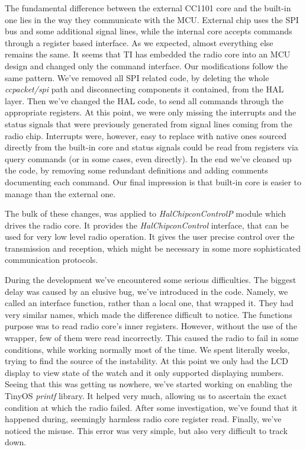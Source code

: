 The fundamental difference between the external CC1101 core and the built-in one lies in the way they communicate with the MCU. External chip uses the SPI bus and some additional signal lines, while the internal core accepts commands through a register based interface. As we expected, almost everything else remains the same. It seems that TI has embedded the radio core into an MCU design and changed only the command interface. Our modifications follow the same pattern. We've removed all SPI related code, by deleting the whole \emph{ccpacket/spi} path and disconnecting components it contained, from the HAL layer. Then we've changed the HAL code, to send all commands through the appropriate registers. At this point, we were only missing the interrupts and the status signals that were previously generated from signal lines coming from the radio chip. Interrupts were, however, easy to replace with native ones sourced directly from the built-in core and status signals could be read from registers via query commands (or in some cases, even directly). In the end we've cleaned up the code, by removing some redundant definitions and adding comments documenting each command. Our final impression is that built-in core is easier to manage than the external one.

The bulk of these changes, was applied to \emph{HalChipconControlP} module which drives the radio core. It provides the \emph{HalChipconControl} interface, that can be used for very low level radio operation. It gives the user precise control over the transmission and reception, which might be necessary in some more sophisticated communication protocols.

During the development we've encountered some serious difficulties. The biggest delay was caused by an elusive bug, we've introduced in the code. Namely, we called an interface function, rather than a local one, that wrapped it. They had very similar names, which made the difference difficult to notice. The functions purpose was to read radio core's inner registers. However, without the use of the wrapper, few of them were read incorrectly. This caused the radio to fail in some conditions, while working normally most of the time. We spent literally weeks, trying to find the source of the instability. At this point we only had the LCD display to view state of the watch and it only supported displaying numbers. Seeing that this was getting us nowhere, we've started working on enabling the TinyOS \emph{printf} library. It helped very much, allowing us to ascertain the exact condition at which the radio failed. After some investigation, we've found that it happened during, seemingly harmless radio core register read. Finally, we've noticed the misuse. This error was very simple, but also very difficult to track down.


